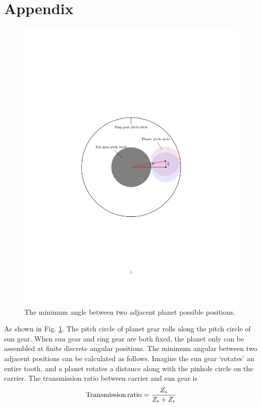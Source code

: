 \documentclass[a4paper,fleqn]{cas-sc}%
\begin{document}
\section*{Appendix\label{Appendix}}
\begin{figure}[pos=htbp]
    \centering
    \includegraphics[scale=0.5]{Minimum_angle.pdf}
    \caption{The minimum angle between two adjacent planet possible positions.}
    \label{fig_mini_angle}
\end{figure}
\par As shown in Fig. \ref{fig_mini_angle}. The pitch circle of planet gear rolls along the pitch circle of sun gear. When sun gear and ring gear are both fixed, the planet only can be assembled at finite discrete angular positions. The minimum angular between two adjacent positions can be calculated as follows. Imagine the sun gear `rotates' an entire tooth, and a planet rotates a distance along with the pinhole circle on the carrier. The transmission ratio between carrier and sun gear is
\begin{equation}
    \operatorname{Transmission\,ratio}=\frac{Z_{\rm s}}{Z_{\rm s}+Z_{\rm r}}
\end{equation}
\end{document}
